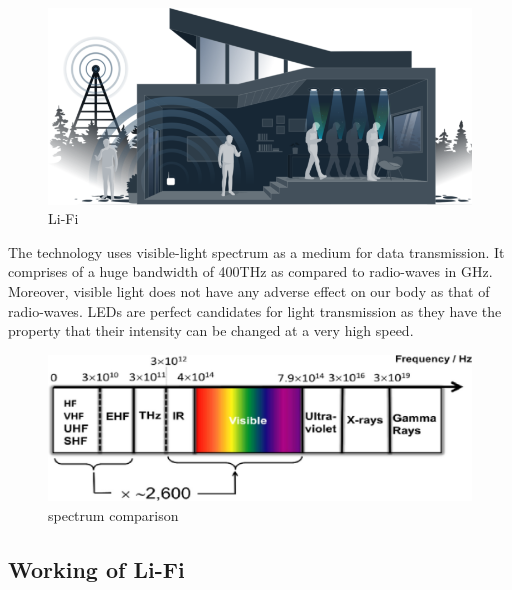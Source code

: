 \documentclass{article}
\begin{document}
\begin{figure}[!h]
  \includegraphics[width=\linewidth]{res/tech-illustration-li-fi.png}
    \caption{Li-Fi \cite{purelifi}}
  \label{fig:tech-illustration-li-fi}
\end{figure}



The technology uses visible-light spectrum as a medium for data transmission. It comprises of a huge bandwidth of 400THz as compared to radio-waves in GHz.
Moreover, visible light does not have any adverse effect on our body as that of radio-waves. LEDs are perfect candidates for light transmission as they have the property that their intensity can be changed at a very high speed.



\begin{figure}[!h]
  \includegraphics[width=\linewidth]{res/spectrum_li_fi.jpg}
    \caption{spectrum comparison \cite{spectrum}}
  \label{fig:spectrum_li_fi}
\end{figure}




\subsection{Working of Li-Fi}


\end{document}
